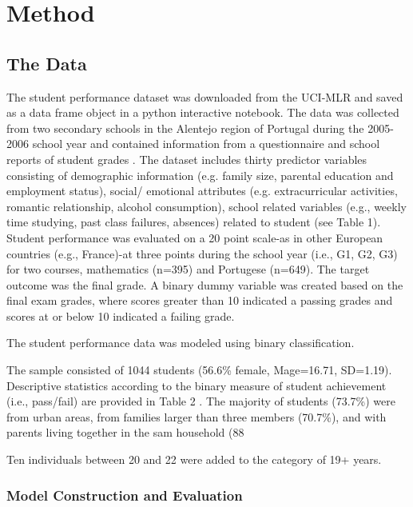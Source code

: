\documentclass[sigconf]{acmart}
\begin{document}

\section{Method}

\subsection{The Data}

The student performance dataset was downloaded from the UCI-MLR and saved as 
a data frame object in a python interactive notebook. The data was collected 
from two secondary schools in the Alentejo region of Portugal during the 
2005-2006 school year and contained information from a questionnaire and 
school reports of student grades \cite{cortez09}. The dataset includes thirty 
predictor variables consisting of demographic information (e.g. family size, 
parental education and employment status), social/ emotional attributes 
(e.g. extracurricular activities, romantic relationship, alcohol consumption), 
school related variables (e.g., weekly time studying, past class failures, 
absences) related to student  (see Table 1). Student performance was evaluated 
on a 20 point scale-as in other European countries (e.g., France)-at three 
points during the school year (i.e., G1, G2, G3) for two courses, mathematics 
(n=395) and Portugese (n=649). The target outcome was the final grade. A binary 
dummy variable was created based on the final exam grades, where scores greater
than 10 indicated a passing grades and scores at or below 10 indicated a 
failing grade. 

The student performance data was modeled using binary classification.

The sample consisted of 1044 students (56.6\% female, Mage=16.71, SD=1.19). 
Descriptive statistics according to the binary measure of student achievement 
(i.e., pass/fail) are provided in Table 2 . The majority of students (73.7\%) 
were from urban areas, from families larger than three members (70.7\%), and 
with parents living together in the sam household (88%

Ten individuals between 20 and 22 were added to the category of 19+ years. 


\subsubsection{Model Construction and Evaluation}
\end{document}
